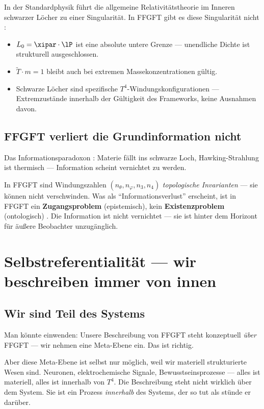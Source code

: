In der Standardphysik führt die allgemeine Relativitätstheorie im Inneren schwarzer Löcher zu einer Singularität. In FFGFT gibt es diese Singularität nicht \cite{Pascher2026}:
\begin{itemize}
  \item $L_0 = \xipar \cdot \lP$ ist eine absolute untere Grenze --- unendliche Dichte ist strukturell ausgeschlossen.
  \item $\tilde{T} \cdot m = 1$ bleibt auch bei extremen Massekonzentrationen gültig.
  \item Schwarze Löcher sind spezifische $T^4$-Windungskonfigurationen --- Extremzustände innerhalb der Gültigkeit des Frameworks, keine Ausnahmen davon.
\end{itemize}

\subsection{FFGFT verliert die Grundinformation nicht}

Das Informationsparadoxon \cite{Hawking1974}: Materie fällt ins schwarze Loch, Hawking-Strahlung ist thermisch --- Information scheint vernichtet zu werden.

In FFGFT sind Windungszahlen $(n_\theta, n_\varphi, n_3, n_4)$ \emph{topologische Invarianten} --- sie können nicht verschwinden. Was als ``Informationsverlust'' erscheint, ist in FFGFT ein \textbf{Zugangsproblem} (epistemisch), kein \textbf{Existenzproblem} (ontologisch) \cite{Bekenstein1973}. Die Information ist nicht vernichtet --- sie ist hinter dem Horizont für äußere Beobachter unzugänglich.

\section{Selbstreferentialität --- wir beschreiben immer von innen}

\subsection{Wir sind Teil des Systems}

Man könnte einwenden: Unsere Beschreibung von FFGFT steht konzeptuell \emph{über} FFGFT --- wir nehmen eine Meta-Ebene ein. Das ist richtig.

Aber diese Meta-Ebene ist selbst nur möglich, weil wir materiell strukturierte Wesen sind. Neuronen, elektrochemische Signale, Bewusstseinsprozesse --- alles ist materiell, alles ist innerhalb von $T^4$. Die Beschreibung steht nicht wirklich über dem System. Sie ist ein Prozess \emph{innerhalb} des Systems, der so tut als stünde er darüber.

